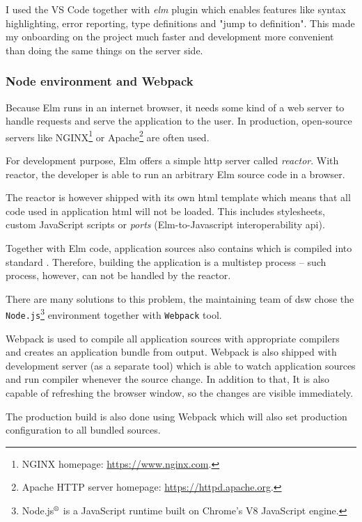 I used the VS Code together with \textit{elm}\cite{gh-elm-pg} plugin which enables features like syntax highlighting, error reporting, type definitions and "jump to definition".
This made my onboarding on the project much faster and development more convenient than doing the same things on the server side.

\subsubsection*{Node environment and Webpack}

Because Elm runs in an internet browser, it needs some kind of a web server to handle requests and serve the application to the user.
In production, open-source servers like NGINX\footnote{NGINX homepage: \url{https://www.nginx.com}.} or Apache\footnote{Apache HTTP server homepage: \url{https://httpd.apache.org}.} are often used\cite{nc-webservers}.

For development purpose, Elm offers a simple \gls{http} server called \textit{reactor}.
With reactor, the developer is able to run an arbitrary Elm source code in a browser.

The reactor is however shipped with its own \gls{html} template which means that all code used in application \gls{html} will not be loaded.
This includes stylesheets, custom JavaScript scripts or \textit{ports} (Elm-to-Javascript interoperability \gls{api}).

Together with Elm code, application sources also contains  which is compiled into standard .
Therefore, building the application is a multistep process -- such process, however, can not be handled by the reactor.

There are many solutions to this problem, the maintaining team of \gls{dsw} chose the \texttt{Node.js}\footnote{Node.js$^\textrm{\textregistered}$ is a JavaScript runtime built on Chrome's V8 JavaScript engine.} environment together with \texttt{Webpack} tool.

Webpack is used to compile all application sources with appropriate compilers and creates an application bundle from output.
Webpack is also shipped with development server (as a separate tool) which is able to watch application sources and run compiler whenever the source change.
In addition to that, It is also capable of refreshing the browser window, so the changes are visible immediately.

The production build is also done using Webpack which will also set production configuration to all bundled sources.


